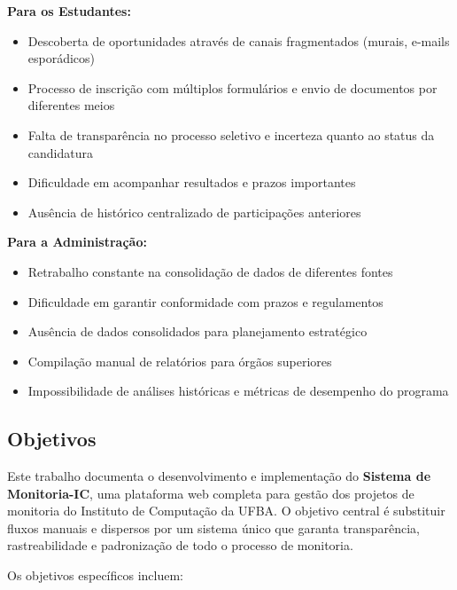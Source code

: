 \documentclass[portuguese]{sbc2025}%
\begin{document}
\textbf{Para os Estudantes:}
\begin{itemize}
  \item Descoberta de oportunidades através de canais fragmentados (murais, e-mails esporádicos)
  \item Processo de inscrição com múltiplos formulários e envio de documentos por diferentes meios
  \item Falta de transparência no processo seletivo e incerteza quanto ao status da candidatura
  \item Dificuldade em acompanhar resultados e prazos importantes
  \item Ausência de histórico centralizado de participações anteriores
\end{itemize}

\textbf{Para a Administração:}
\begin{itemize}
  \item Retrabalho constante na consolidação de dados de diferentes fontes
  \item Dificuldade em garantir conformidade com prazos e regulamentos
  \item Ausência de dados consolidados para planejamento estratégico
  \item Compilação manual de relatórios para órgãos superiores
  \item Impossibilidade de análises históricas e métricas de desempenho do programa
\end{itemize}

\subsection{Objetivos}

Este trabalho documenta o desenvolvimento e implementação do \textbf{Sistema de Monitoria-IC}, uma plataforma web completa para gestão dos projetos de monitoria do Instituto de Computação da UFBA. O objetivo central é substituir fluxos manuais e dispersos por um sistema único que garanta transparência, rastreabilidade e padronização de todo o processo de monitoria.

Os objetivos específicos incluem:
\end{document}
